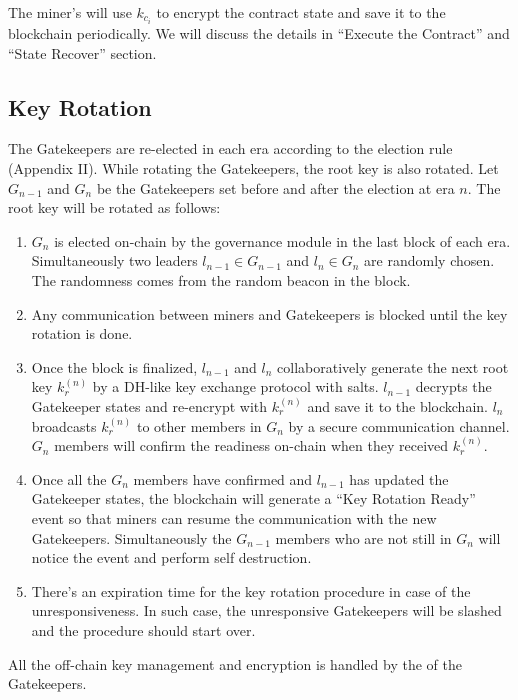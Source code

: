 The miner's \pruntime will use $k_{c_i}$ to encrypt the contract state and save it to the blockchain periodically. We will discuss the details in ``Execute the Contract'' and ``State Recover'' section.



\subsection{Key Rotation}

The Gatekeepers are re-elected in each era according to the election rule (Appendix II). While rotating the Gatekeepers, the root key is also rotated. Let $G_{n-1}$ and $G_n$ be the Gatekeepers set before and after the election at era $n$. The root key will be rotated as follows:

\begin{enumerate}
    \item $G_n$ is elected on-chain by the governance module in the last block of each era. Simultaneously two leaders $l_{n-1} \in G_{n-1}$ and $l_n \in G_n$ are randomly chosen. The randomness comes from the random beacon in the block.
    \item Any communication between miners and Gatekeepers is blocked until the key rotation is done.
    \item Once the block is finalized, $l_{n-1}$ and $l_n$ collaboratively generate the next root key $k_r^{(n)}$ by a DH-like key exchange protocol with salts. $l_{n-1}$ decrypts the Gatekeeper states and re-encrypt with $k_r^{(n)}$ and save it to the blockchain. $l_n$ broadcasts $k_r^{(n)}$ to other members in $G_n$ by a secure communication channel. $G_n$ members will confirm the readiness on-chain when they received $k_r^{(n)}$.
    \item Once all the $G_n$ members have confirmed and $l_{n-1}$ has updated the Gatekeeper states, the blockchain will generate a ``Key Rotation Ready'' event so that miners can resume the communication with the new Gatekeepers. Simultaneously the $G_{n-1}$ members who are not still in $G_n$ will notice the event and perform self destruction.
    \item There's an expiration time for the key rotation procedure in case of the unresponsiveness. In such case, the unresponsive Gatekeepers will be slashed and the procedure should start over.
\end{enumerate}

All the off-chain key management and encryption is handled by the \pruntime of the Gatekeepers.

